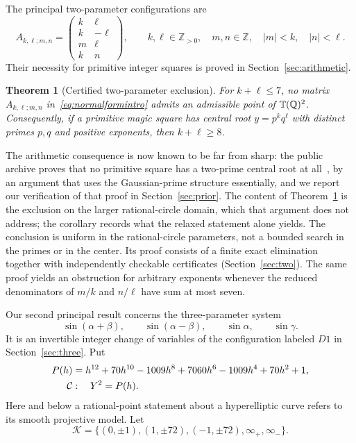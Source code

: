 \documentclass[11pt,letterpaper]{article}
\newtheorem{theorem}{Theorem}[section]
\theoremstyle{definition}\newtheorem{definition}[theorem]{Definition}
\theoremstyle{remark}\newtheorem{remark}[theorem]{Remark}
\newcommand{\Q}{\mathbb Q}\newcommand{\Z}{\mathbb Z}\newcommand{\R}{\mathbb R}
\begin{document}
The principal two-parameter configurations are
\begin{equation}\label{eq:normalformintro}
 A_{k,\ell;m,n}=
 \begin{pmatrix}k&\ell\\k&-\ell\\m&\ell\\k&n\end{pmatrix},
 \qquad k,\ell\in\Z_{>0},\quad m,n\in\Z,\quad |m|<k,\quad |n|<\ell.
\end{equation}
Their necessity for primitive integer squares is proved in Section~\ref{sec:arithmetic}.

\begin{theorem}[Certified two-parameter exclusion]\label{thm:main-two}
For $k+\ell\le7$, no matrix $A_{k,\ell;m,n}$ in~\eqref{eq:normalformintro} admits an admissible point of $\T(\Q)^2$. Consequently, if a primitive magic square has central root $y=p^kq^\ell$ with distinct primes $p,q$ and positive exponents, then $k+\ell\ge8$.
\end{theorem}
The arithmetic consequence is now known to be far from sharp: the public archive proves that no primitive square has a two-prime central root at all~\cite{MSSTwoBlock}, by an argument that uses the Gaussian-prime structure essentially, and we report our verification of that proof in Section~\ref{sec:prior}. The content of Theorem~\ref{thm:main-two} is the exclusion on the larger rational-circle domain, which that argument does not address; the corollary records what the relaxed statement alone yields. The conclusion is uniform in the rational-circle parameters, not a bounded search in the primes or in the center. Its proof consists of a finite exact elimination together with independently checkable certificates (Section~\ref{sec:two}). The same proof yields an obstruction for arbitrary exponents whenever the reduced denominators of $m/k$ and $n/\ell$ have sum at most seven.

Our second principal result concerns the three-parameter system
\begin{equation}\label{eq:canonicalintro}
 \sin(\alpha+\beta),\qquad\sin(\alpha-\beta),\qquad
 \sin\alpha,\qquad\sin\gamma.
\end{equation}
It is an invertible integer change of variables of the configuration labeled $D1$ in Section~\ref{sec:three}. Put
\begin{align}
 P(h)&=h^{12}+70h^{10}-1009h^8+7060h^6
                  -1009h^4+70h^2+1,\label{eq:Pintro}\\
 \mathcal C&:\quad Y^2=P(h).\notag
\end{align}
Here and below a rational-point statement about a hyperelliptic curve refers to its smooth projective model. Let
\begin{equation}\label{eq:knownintro}
 \mathcal K=\{(0,\pm1),(1,\pm72),(-1,\pm72),\infty_+,\infty_-\}.
\end{equation}
\end{document}
